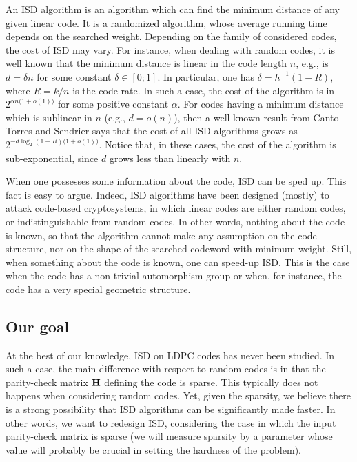 An ISD algorithm is an algorithm which can find the minimum distance of any given linear code.
It is a randomized algorithm, whose average running time depends on the searched weight.
Depending on the family of considered codes, the cost of ISD may vary.
For instance, when dealing with random codes, it is well known that the minimum distance is linear in the code length $n$, e.g., is $d = \delta n$ for some constant $\delta\in [0 ; 1]$.
In particular, one has $\delta = h^{-1}(1-R)$, where $R = k/n$ is the code rate.
In such a case, the cost of the algorithm is in $2^{\alpha n\big(1+o(1)\big)}$ for some positive constant $\alpha$.
For codes having a minimum distance which is sublinear in $n$ (e.g., $d = o(n)$), then a well known result from Canto-Torres and Sendrier says that the cost of all ISD algorithms grows as $2^{-d\log_2(1-R)\big(1+o(1)\big)}$.
Notice that, in these cases, the cost of the algorithm is sub-exponential, since $d$ grows less than linearly with $n$.

When one possesses some information about the code, ISD can be sped up.
This fact is easy to argue.
Indeed, ISD algorithms have been designed (mostly) to attack code-based cryptosystems, in which linear codes are either random codes, or indistinguishable from random codes.
In other words, nothing about the code is known, so that the algorithm cannot make any assumption on the code structure, nor on the shape of the searched codeword with minimum weight.
Still, when something about the code is known, one can speed-up ISD.
This is the case when the code has a non trivial automorphism group or when, for instance, the code has a very special geometric structure.

\subsection{Our goal}

At the best of our knowledge, ISD on LDPC codes has never been studied.
In such a case, the main difference with respect to random codes is in that the parity-check matrix $\mathbf H$ defining the code is sparse.
This typically does not happens when considering random codes.
Yet, given the sparsity, we believe there is a strong possibility that ISD algorithms can be significantly made faster.
In other words, we want to redesign ISD, considering the case in which the input parity-check matrix is sparse (we will measure sparsity by a parameter whose value will probably be crucial in setting the hardness of the problem).

